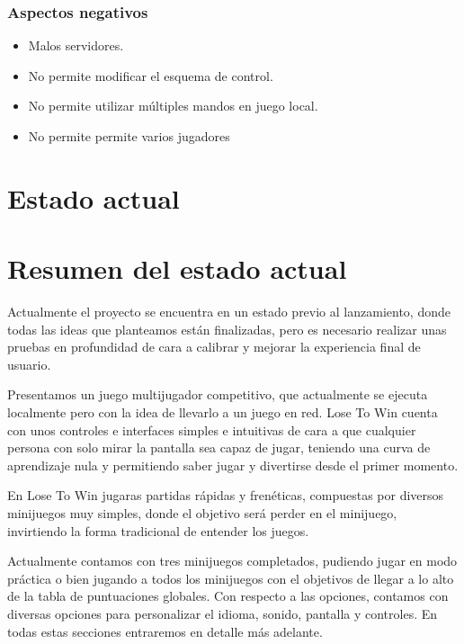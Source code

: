\documentclass[12pt, spanish]{article}
\begin{document}
\subsubsection{Aspectos negativos}

\begin{itemize}
	\item Malos servidores.
	\item No permite modificar el esquema de control.
	\item No permite utilizar múltiples mandos en juego local.
	\item No permite permite varios jugadores
\end{itemize}

\section*{Estado actual}
\label{sec:estado_actual}

\section{Resumen del estado actual}

Actualmente el proyecto se encuentra en un estado previo al lanzamiento, donde todas las ideas que planteamos están finalizadas, pero es necesario realizar unas pruebas en profundidad de cara a calibrar y mejorar la experiencia final de usuario.

Presentamos un juego multijugador competitivo, que actualmente se ejecuta localmente pero con la idea de llevarlo a un juego en red. Lose To Win cuenta con unos controles e interfaces simples e intuitivas de cara a que cualquier persona con solo mirar la pantalla sea capaz de jugar, teniendo una curva de aprendizaje nula y permitiendo saber jugar y divertirse desde el primer momento.

En Lose To Win jugaras partidas rápidas y frenéticas, compuestas por diversos minijuegos muy simples, donde el objetivo será perder en el minijuego, invirtiendo la forma tradicional de entender los juegos.

Actualmente contamos con tres minijuegos completados, pudiendo jugar en modo práctica o bien jugando a todos los minijuegos con el objetivos de llegar a lo alto de la tabla de puntuaciones globales. Con respecto a las opciones, contamos con diversas opciones para personalizar el idioma, sonido, pantalla y controles. En todas estas secciones entraremos en detalle más adelante.
\end{document}

